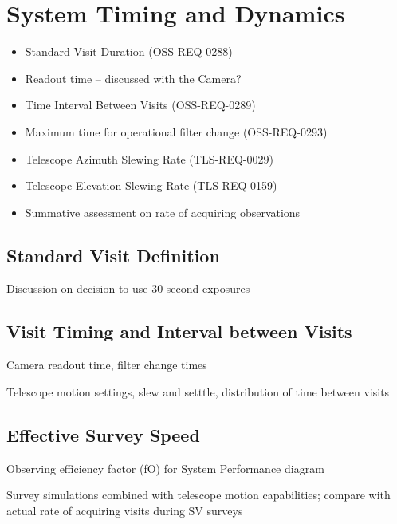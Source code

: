 \section{System Timing and Dynamics}
\label{sec:system_timing}

\begin{itemize}
    \item Standard Visit Duration (OSS-REQ-0288)
    \item Readout time – discussed with the Camera?
    \item Time Interval Between Visits (OSS-REQ-0289)
    \item Maximum time for operational filter change (OSS-REQ-0293)
    \item Telescope Azimuth Slewing Rate (TLS-REQ-0029)
    \item Telescope Elevation Slewing Rate (TLS-REQ-0159)
    \item Summative assessment on rate of acquiring observations
\end{itemize}

\subsection{Standard Visit Definition}

Discussion on decision to use 30-second exposures

\subsection{Visit Timing and Interval between Visits}

Camera readout time, filter change times

Telescope motion settings, slew and setttle, distribution of time between visits

\subsection{Effective Survey Speed}

Observing efficiency factor (fO) for System Performance diagram

Survey simulations combined with telescope motion capabilities; compare with actual rate of acquiring visits during SV surveys
